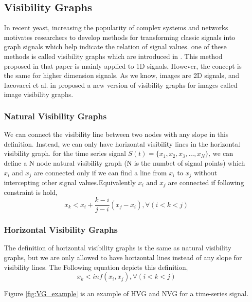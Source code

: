 \documentclass[conference]{IEEEtran}
\begin{document}
\subsection{\textbf{Visibility Graphs}}
In recent yeast, increasing the popularity of complex systems and networks motivates researchers to develop methods for transforming classic signals into graph signals which help indicate the relation of signal values. one of these methods is called visibility graphs which are introduced in \cite{VG}. This method proposed in that paper is mainly applied to 1D signals. However, the concept is the same for higher dimension signals. As we know, images are 2D signals, and Iacovacci et al. in \cite{IVG} proposed a new version of visibility graphs for images called image visibility graphs.



\subsubsection{Natural Visibility Graphs}
We can connect the visibility line between two nodes with any slope in this definition. Instead, we can only have horizontal visibility lines in the horizontal visibility graph.
for the time series signal $S(t)=\{x_1,x_2,x_3,...,x_N\}$, we can define a N node natural visibility graph (N is the numbet of signal points) which $x_i$ and $x_j$ are connected only if we can find a line from $x_i$ to $x_j$ without intercepting other signal values.Equivalently $x_i$ and $x_j$ are connected if following constraint is hold,
\begin{equation}
x_k < x_i +\frac{k-i}{j-i}(x_j-x_i), \forall(i<k<j)
\end{equation}



\subsubsection{Horizontal Visibility Graphs}
The definition of horizontal visibility graphs is the same as natural visibility graphs, but we are only allowed to have horizontal lines instead of any slope for visibility lines. The Following equation depicts this definition,
\begin{equation}
x_k < inf(x_i, x_j), \forall(i<k<j)
\end{equation}

Figure \ref{fig:VG_example} is an example of HVG and NVG for a time-series signal.
\end{document}
